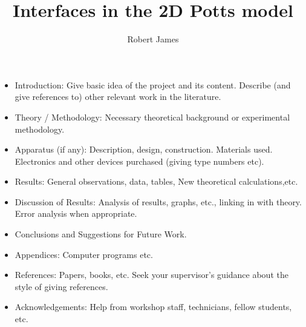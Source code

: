 \documentclass[12pt,a4paper,twoside]{memoir}
\author{Robert James}
\title{Interfaces in the 2D Potts model}
\begin{document}
\begin{itemize}
	\item Introduction: Give basic idea of the project and its content. Describe (and give references to) other relevant work in the literature.
	\item Theory / Methodology: Necessary theoretical background or experimental methodology.
	\item Apparatus (if any): Description, design, construction. Materials used. Electronics and other devices purchased (giving type numbers etc).
	\item Results: General observations, data, tables, New theoretical calculations,etc.
	\item Discussion of Results: Analysis of results, graphs, etc., linking in with theory. Error analysis when appropriate.
	\item Conclusions and Suggestions for Future Work.
	\item Appendices: Computer programs etc.
	\item References: Papers, books, etc. Seek your supervisor’s guidance about the style of giving references.
	\item Acknowledgements: Help from workshop staff, technicians, fellow students, etc.

\end{itemize}




















\end{document}
